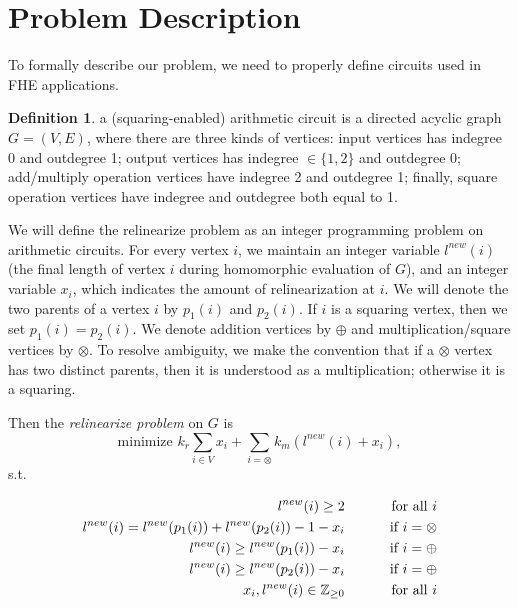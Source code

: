 \documentclass[11pt]{article} %
\theoremstyle{plain}
\theoremstyle{definition}
\newtheorem{definition}{Definition}
\begin{document}
\section{Problem Description}

To formally describe our problem, we need to properly define circuits used in FHE applications. 

\begin{definition}
a (squaring-enabled) arithmetic circuit is a directed acyclic graph $G = (V,E)$, where there are three kinds of vertices: input vertices has indegree 0 and outdegree 1; output vertices has indegree $\in \{1, 2\}$ and outdegree 0; add/multiply operation vertices have indegree 2 and outdegree 1; finally, square operation vertices have indegree and outdegree both equal to 1. 
\end{definition}

We will define the relinearize problem as an integer programming problem on  arithmetic circuits. For every vertex $i$, we maintain an integer variable $l^{new}(i)$ (the final length of vertex $i$ during homomorphic evaluation of $G$), and an integer 
variable $x_i$, which indicates the amount of relinearization at $i$. We will denote the two parents of a vertex $i$ by $p_1(i)$ and $p_2(i)$. If $i$ is a squaring vertex, then we set $p_1(i) = p_2(i)$. We denote addition vertices by $\oplus$ and multiplication/square vertices by $\otimes$. To resolve ambiguity, we make the convention that if a $\otimes$ vertex has two distinct parents, then it is understood as a multiplication; otherwise it is a squaring.

Then the {\it relinearize problem} on $G$ is 
\[
	\mbox{minimize } k_r \sum_{i \in V } x_i  + \sum_{i = \otimes} k_m (l^{new}(i) + x_i), 
\]
s.t. 

\begin{align*}
l^{new}(i) \geq 2  & \qquad &\mbox{ for all } i \\ 
l^{new}(i)  = l^{new}(p_1(i)) + l^{new}(p_2(i)) - 1 - x_i  & \qquad & \mbox{if } i = \otimes \\ 
l^{new}(i)  \geq l^{new}(p_1(i))  - x_i  & \qquad & \mbox{if } i = \oplus \\ 
l^{new}(i)  \geq l^{new}(p_2(i))  - x_i  & \qquad & \mbox{if } i = \oplus \\
x_i, l^{new}(i) \in \mathbb{Z}_{\geq 0}  & \qquad &\mbox{ for all } i \\
\end{align*}
\end{document}
